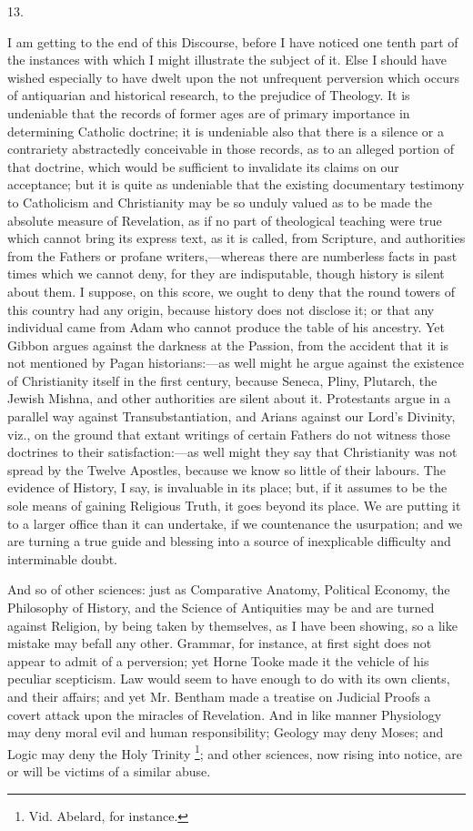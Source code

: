 13.

I am getting to the end of this Discourse, before I have noticed
one tenth part of the instances with which I might illustrate the
subject of it. Else I should have wished especially to have dwelt upon
the not unfrequent perversion which occurs of antiquarian and
historical research, to the prejudice of Theology. It is undeniable
that the records of former ages are of primary importance in
determining Catholic doctrine; it is undeniable also that there is a
silence or a contrariety abstractedly conceivable in those records, as
to an alleged portion of that doctrine, which would be sufficient to
invalidate its claims on our acceptance; but it is quite as undeniable
that the existing documentary testimony to Catholicism and
Christianity may be so unduly valued as to be made the absolute
measure of Revelation, as if no part of theological teaching were true
which cannot bring its express text, as it is called, from Scripture,
and authorities from the Fathers or profane writers,—whereas there
are numberless facts in past times which we cannot deny, for they are
indisputable, though history is silent about them. I suppose, on this
score, we ought to deny that the round towers of this country had any
origin, because history does not disclose it; or that any individual
came from Adam who cannot produce the table of his ancestry. Yet
Gibbon argues against the darkness at the Passion, from the accident
that it is not mentioned by Pagan historians:—as well might he argue
against the existence of Christianity itself in the first century,
because Seneca, Pliny, Plutarch, the Jewish Mishna, and other
authorities are silent about it. Protestants argue in a parallel way
against Transubstantiation, and Arians against our Lord's Divinity,
viz., on the ground that extant writings of certain Fathers do not
witness those doctrines to their satisfaction:—as well might they
say that Christianity was not spread by the Twelve Apostles, because
we know so little of their labours. The evidence of History, I say, is
invaluable in its place; but, if it assumes to be the sole means of
gaining Religious Truth, it goes beyond its place. We are putting it
to a larger office than it can undertake, if we countenance the
usurpation; and we are turning a true guide and blessing into a source
of inexplicable difficulty and interminable doubt.

And so of other sciences: just as Comparative Anatomy, Political
Economy, the Philosophy of History, and the Science of Antiquities may
be and are turned against Religion, by being taken by themselves, as I
have been showing, so a like mistake may befall any other.
Grammar, for instance, at first sight does not appear to admit of a
perversion; yet Horne Tooke made it the vehicle of his peculiar
scepticism. Law would seem to have enough to do with its own clients,
and their affairs; and yet Mr. Bentham made a treatise on Judicial
Proofs a covert attack upon the miracles of Revelation. And in like
manner Physiology may deny moral evil and human responsibility;
Geology may deny Moses; and Logic may deny the Holy Trinity \footnote{Vid. Abelard,
for instance.}; and other sciences, now rising into notice, are or will be
victims of a similar abuse.

